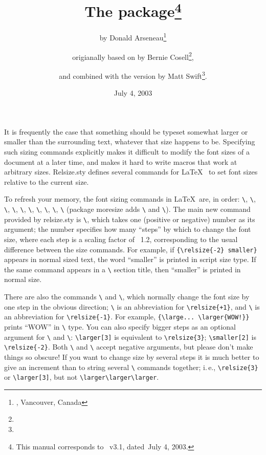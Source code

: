 \documentclass[pagesize=auto]{scrartcl}
\title{The \pkg{relsize} package\thanks{This manual corresponds to \pkg{relsize.sty}~v3.1, dated~July 4, 2003.}}
\author{%
  by Donald Arseneau\thanks{\mail{asnd@triumf.ca},  Vancouver, Canada}%
  \and origianally based on \pkg{smaller.sty} by Bernie Cosell\thanks{\mail{cosell@WILMA.BBN.COM}},%
  \and and combined with the version by Matt Swift\thanks{\mail{swift@bu.edu}}.%
}
\date{July 4, 2003}
\makeatletter
\newcommand*{\pkg}[1]{\textsf{#1}}
\newcommand*{\cs}[1]{\texttt{\textbackslash#1}}
\newcommand*{\cmd}[1]{\cs{\expandafter\@gobble\string#1}}
\makeatother
\begin{document}
\maketitle

\noindent
It is frequently the case that something should be typeset somewhat larger
or smaller than the surrounding text, whatever that size happens to be.
Specifying such sizing commands explicitly makes it difficult to modify the
font sizes of a document at a later time, and makes it hard to write macros
that work at arbitrary sizes.  \pkg{Relsize.sty} defines several commands for \LaTeX\ %
to set font sizes relative to the current size.

To refresh your memory, the font sizing commands in \LaTeX\ are, in order:
\cmd{\tiny}, \cmd{\scriptsize}, \cmd{\footnotesize}, \cmd{\small}, \cmd{\normalsize}, \cmd{\large}, \cmd{\Large},
\cmd{\LARGE}, \cmd{\huge}, \cmd{\Huge} (package \pkg{moresize} adds \cmd{\ssmall} and \cmd{\HUGE}).  The main 
new command provided by \pkg{relsize.sty} is \cmd{\relsize}, which takes one (positive
or negative) number as its argument; the number specifies how many ``steps''
by which to change the font size, where each step is a scaling factor of~%
1.2, corresponding to the usual difference between the size commands.  For
example, if \verb|{\relsize{-2} smaller}| appears in normal sized text, the word
``smaller'' is printed in script size type.  If the same command appears in a 
\cmd{\Large} section title, then ``smaller'' is printed in normal size. 

\begin{sloppypar}
  There are also the commands \cmd{\larger} and \cmd{\smaller}, which normally change the
  font size by one step in the obvious direction; \cmd{\larger} is an abbreviation
  for \verb|\relsize{+1}|, and \cmd{\smaller} is an abbreviation for \verb|\relsize{-1}|. For
  example, \verb+{\large... \larger{WOW!}}+ prints ``WOW'' in \cmd{\Large} type.  You can
  also specify bigger steps as an optional argument for \cmd{\larger} and \cmd{\smaller}: 
  \verb+\larger[3]+ is equivalent to \verb+\relsize{3}+; \verb+\smaller[2]+ is \verb+\relsize{-2}+.
  Both \cmd{\larger} and \cmd{\smaller} accept negative arguments, but please don't make
  things so obscure!  If you want to change size by several steps it is 
  much better to give an increment than to string several \cmd{\larger} commands
  together; i.\,e.\@, \verb+\relsize{3}+ or \verb+\larger[3]+, but not \verb+\larger\larger\larger+.
\end{sloppypar}
\end{document}
